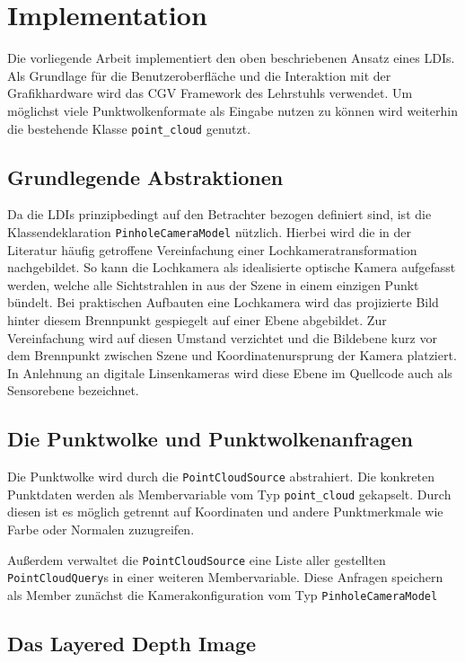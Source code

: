 \documentclass[hyperref, beleg, german]{cgvpub}
\begin{document}
\chapter{Implementation}

Die vorliegende Arbeit implementiert den oben beschriebenen Ansatz eines LDIs.
Als Grundlage für die Benutzeroberfläche und die Interaktion mit der
Grafikhardware wird das CGV Framework des Lehrstuhls verwendet. Um möglichst
viele Punktwolkenformate als Eingabe nutzen zu können wird weiterhin die
bestehende Klasse \texttt{point\_cloud} genutzt.

\section{Grundlegende Abstraktionen}

Da die LDIs prinzipbedingt auf den Betrachter bezogen definiert sind, ist die
Klassendeklaration \texttt{PinholeCameraModel} nützlich. Hierbei wird die in
der Literatur häufig getroffene Vereinfachung einer Lochkameratransformation
nachgebildet. So kann die Lochkamera als idealisierte optische Kamera
aufgefasst werden, welche alle Sichtstrahlen in aus der Szene in einem einzigen
Punkt bündelt. Bei praktischen Aufbauten eine Lochkamera wird das projizierte
Bild hinter diesem Brennpunkt gespiegelt auf einer Ebene abgebildet. Zur
Vereinfachung wird auf diesen Umstand verzichtet und die Bildebene kurz vor dem
Brennpunkt zwischen Szene und Koordinatenursprung der Kamera platziert. In
Anlehnung an digitale Linsenkameras wird diese Ebene im Quellcode auch als
Sensorebene bezeichnet.

\section{Die Punktwolke und Punktwolkenanfragen}

Die Punktwolke wird durch die \texttt{PointCloudSource} abstrahiert. Die
konkreten Punktdaten werden als Membervariable vom Typ \texttt{point\_cloud}
gekapselt. Durch diesen ist es möglich getrennt auf Koordinaten und andere
Punktmerkmale wie Farbe oder Normalen zuzugreifen.

Außerdem verwaltet die \texttt{PointCloudSource} eine Liste aller gestellten
\texttt{PointCloudQuery}s in einer weiteren Membervariable. Diese Anfragen speichern als Member zunächst die Kamerakonfiguration vom Typ \texttt{PinholeCameraModel}

\section{Das Layered Depth Image}
\end{document}
